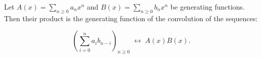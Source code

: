 Let $A(x) = \sum_{n \geq 0} a_n x^n$ and $B(x) = \sum_{n \geq 0} b_n x^n$ be generating functions. Then their product is the generating function of the convolution of the sequences:

$$\left( \sum_{i=0}^{n} a_i b_{n-i} \right)_{n \geq 0} \;\longleftrightarrow\; A(x) B(x).$$
